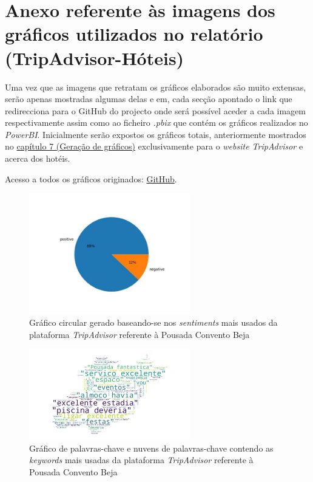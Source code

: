 \chapter{Anexo referente às imagens dos gráficos utilizados no relatório (TripAdvisor-Hóteis)}

Uma vez que as imagens que retratam os gráficos elaborados são muito extensas, serão apenas mostradas algumas delas e em, cada secção apontado o link que redirecciona para o GitHub do projecto onde será possível aceder a cada imagem respectivamente assim como ao ficheiro \textit{.pbix} que contém os gráficos realizados no \textit{PowerBI}.
Inicialmente serão expostos os gráficos totais, anteriormente mostrados no \hyperref[cap7]{ capítulo 7 (Geração de gráficos)} exclusivamente para o \textit{website TripAdvisor} e acerca dos hotéis.

Acesso a todos os gráficos originados: \href{https://github.com/CatKinKitKat/pi2021/tree/master/projecto/datascience/graphs/TripAdvisor/hotels}{GitHub}.

\label{an1}
\begin{figure}[!htb]
\centering
\includegraphics[width=7cm]{figuras/TripAdvisor/Hotels/hotel0_sentiments.jpeg}
\caption{Gráfico circular gerado baseando-se nos \textit{sentiments} mais usados da plataforma \textit{TripAdvisor} referente à Pousada Convento Beja}
\label{fig:exemplofig}
\end{figure}

\begin{figure}[!htb]
\centering
\includegraphics[width=7cm]{figuras/TripAdvisor/Hotels/hotel0_keywordcloud.jpeg}
\caption{Gráfico de palavras-chave e nuvens de palavras-chave contendo as \textit{keywords} mais usadas da plataforma \textit{TripAdvisor} referente à Pousada Convento Beja}
\label{fig:exemplofig}
\end{figure}

